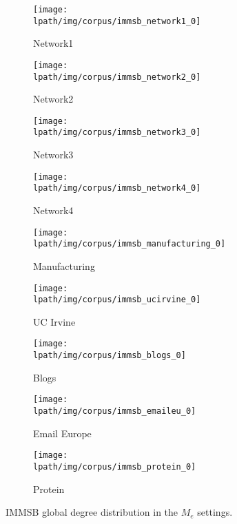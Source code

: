 
\begin{figure}[h]
        \centering
        \begin{subfigure}[b]{0.300\textwidth}
            \centering
            \texttt{[image: \\lpath/img/corpus/immsb\_network1\_0]}
            \caption {{\small Network1}}    
        \end{subfigure}
        \begin{subfigure}[b]{0.300\textwidth}
            \centering
            \texttt{[image: \\lpath/img/corpus/immsb\_network2\_0]}
            \caption {{\small Network2}}    
        \end{subfigure}
        \begin{subfigure}[b]{0.300\textwidth}
            \centering
            \texttt{[image: \\lpath/img/corpus/immsb\_network3\_0]}
            \caption {{\small Network3}}    
        \end{subfigure}
        \begin{subfigure}[b]{0.300\textwidth}
            \centering
            \texttt{[image: \\lpath/img/corpus/immsb\_network4\_0]}
            \caption {{\small Network4}}    
        \end{subfigure}
        \begin{subfigure}[b]{0.300\textwidth}
            \centering
            \texttt{[image: \\lpath/img/corpus/immsb\_manufacturing\_0]}
            \caption {{\small Manufacturing}}    
        \end{subfigure}
        \begin{subfigure}[b]{0.300\textwidth}
            \centering
            \texttt{[image: \\lpath/img/corpus/immsb\_ucirvine\_0]}
            \caption {{\small UC Irvine}}    
            \label{fig:mean and std of net14}
        \end{subfigure}
        \begin{subfigure}[b]{0.300\textwidth}
            \centering
            \texttt{[image: \\lpath/img/corpus/immsb\_blogs\_0]}
            \caption {{\small Blogs}}    
            \label{fig:mean and std of net14}
        \end{subfigure}
        \begin{subfigure}[b]{0.300\textwidth}
            \centering
            \texttt{[image: \\lpath/img/corpus/immsb\_emaileu\_0]}
            \caption {{\small Email Europe}}    
            \label{fig:mean and std of net14}
        \end{subfigure}
        \begin{subfigure}[b]{0.300\textwidth}
            \centering
            \texttt{[image: \\lpath/img/corpus/immsb\_protein\_0]}
            \caption {{\small Protein}}    
            \label{fig:mean and std of net14}
        \end{subfigure}
        \caption{IMMSB global degree distribution in the $M_e$ settings. } 
        \label{fig:me_fit_gburst_mmsb}
\end{figure}

